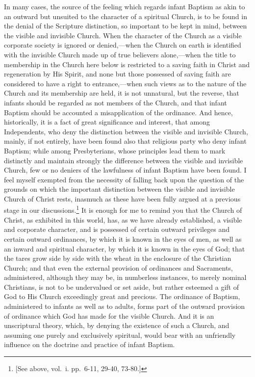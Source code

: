 \documentclass[english,]{book}
\begin{document}
In many cases, the source of the feeling which regards infant Baptism as akin to an outward but unsuited to the character of a spiritual Church, is to be found in the denial of the Scripture distinction, so important to be kept in mind, between the visible and invisible Church. When the character of the Church as a visible corporate society is ignored or denied,---when the Church on earth is identified with the invisible Church made up of true believers alone,---when the title to membership in the Church here below is restricted to a saving faith in Christ and regeneration by His Spirit, and none but those possessed of saving faith are considered to have a right to entrance,---when such views as to the nature of the Church and its membership are held, it is not unnatural, but the reverse, that infants should be regarded as not members of the Church, and that infant Baptism should be accounted a misapplication of the ordinance. And hence, historically, it is a fact of great significance and interest, that among Independents, who deny the distinction between the visible and invisible Church, mainly, if not entirely, have been found also that religious party who deny infant Baptism; while among Presbyterians, whose principles lead them to mark distinctly and maintain strongly the difference between the visible and invisible Church, few or no deniers of the lawfulness of infant Baptism have been found. I feel myself exempted from the necessity of falling back upon the question of the grounds on which the important distinction between the visible and invisible Church of Christ rests, inasmuch as these have been fully argued at a previous stage in our discussions.\footnote{{[}See above, vol.~i. pp.~6-11, 29-40, 73-80.{]}} It is enough for me to remind you that the Church of Christ, as exhibited in this world, has, as we have already established, a visible and corporate character, and is possessed of certain outward privileges and certain outward ordinances, by which it is known in the eyes of men, as well as an inward and spiritual character, by which it is known in the eyes of God; that the tares grow side by side with the wheat in the enclosure of the Christian Church; and that even the external provision of ordinances and Sacraments, administered, although they may be, in numberless instances, to merely nominal Christians, is not to be undervalued or set aside, but rather esteemed a gift of God to His Church exceedingly great and precious. The ordinance of Baptism, administered to infants as well as to adults, forms part of the outward provision of ordinance which God has made for the visible Church. And it is an unscriptural theory, which, by denying the existence of such a Church, and assuming one purely and exclusively spiritual, would bear with an unfriendly influence on the doctrine and practice of infant Baptism.
\end{document}
